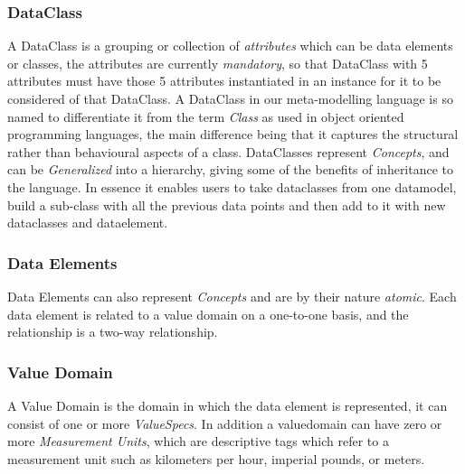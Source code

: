 \subsubsection{DataClass}
A DataClass is a grouping or collection of \emph{attributes} which can be data elements or classes, the attributes are currently \emph{mandatory}, so that DataClass with 5 attributes must have those 5 attributes instantiated in an instance for it to be considered of that DataClass. A DataClass in our meta-modelling language is so named to differentiate it from the term \emph{Class} as used in object oriented programming languages, the main difference being that it captures the structural rather than behavioural aspects of a class.  DataClasses represent \emph{Concepts}, and can be \emph{Generalized} into a hierarchy, giving some of the benefits of inheritance to the language. In essence it enables users to take dataclasses from one datamodel, build a sub-class with all the previous data points and then add to it with new dataclasses and dataelement.
\subsubsection{Data Elements} 
Data Elements can also represent \emph{Concepts} and are by their nature \emph{atomic}.  Each data element is related to a value domain on a one-to-one basis, and the relationship is a two-way relationship.
\subsubsection{Value Domain}
A Value Domain is the domain in which the data element is represented, it can consist of one or more \emph{ValueSpecs}. In addition a valuedomain can have zero or more \emph{Measurement Units}, which are descriptive tags which refer to a measurement unit such as kilometers per hour, imperial pounds, or meters. 
